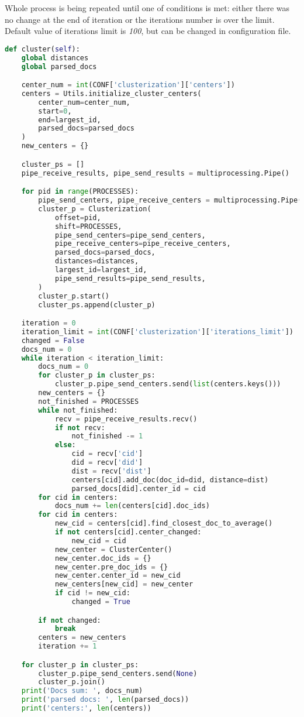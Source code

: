 Whole process is being repeated until one of conditions is met: either there was no change at the end of iteration or the iterations number is over the limit. Default value of iterations limit is \textit{100}, but can be changed in configuration file.

\begin{lstlisting}[language=Python, caption={Main.cluster() - Main process method for conducting clustering}, label={lst:main:cluster}]
def cluster(self):
    global distances
    global parsed_docs

    center_num = int(CONF['clusterization']['centers'])
    centers = Utils.initialize_cluster_centers(
        center_num=center_num,
        start=0,
        end=largest_id,
        parsed_docs=parsed_docs
    )
    new_centers = {}

    cluster_ps = []
    pipe_receive_results, pipe_send_results = multiprocessing.Pipe()

    for pid in range(PROCESSES):
        pipe_send_centers, pipe_receive_centers = multiprocessing.Pipe()
        cluster_p = Clusterization(
            offset=pid,
            shift=PROCESSES,
            pipe_send_centers=pipe_send_centers,
            pipe_receive_centers=pipe_receive_centers,
            parsed_docs=parsed_docs,
            distances=distances,
            largest_id=largest_id,
            pipe_send_results=pipe_send_results,
        )
        cluster_p.start()
        cluster_ps.append(cluster_p)

    iteration = 0
    iteration_limit = int(CONF['clusterization']['iterations_limit'])
    changed = False
    docs_num = 0
    while iteration < iteration_limit:
        docs_num = 0
        for cluster_p in cluster_ps:
            cluster_p.pipe_send_centers.send(list(centers.keys()))
        new_centers = {}
        not_finished = PROCESSES
        while not_finished:
            recv = pipe_receive_results.recv()
            if not recv:
                not_finished -= 1
            else:
                cid = recv['cid']
                did = recv['did']
                dist = recv['dist']
                centers[cid].add_doc(doc_id=did, distance=dist)
                parsed_docs[did].center_id = cid
        for cid in centers:
            docs_num += len(centers[cid].doc_ids)
        for cid in centers:
            new_cid = centers[cid].find_closest_doc_to_average()
            if not centers[cid].center_changed:
                new_cid = cid
            new_center = ClusterCenter()
            new_center.doc_ids = {}
            new_center.pre_doc_ids = {}
            new_center.center_id = new_cid
            new_centers[new_cid] = new_center
            if cid != new_cid:
                changed = True

        if not changed:
            break
        centers = new_centers
        iteration += 1

    for cluster_p in cluster_ps:
        cluster_p.pipe_send_centers.send(None)
        cluster_p.join()
    print('Docs sum: ', docs_num)
    print('parsed docs: ', len(parsed_docs))
    print('centers:', len(centers))
\end{lstlisting}

